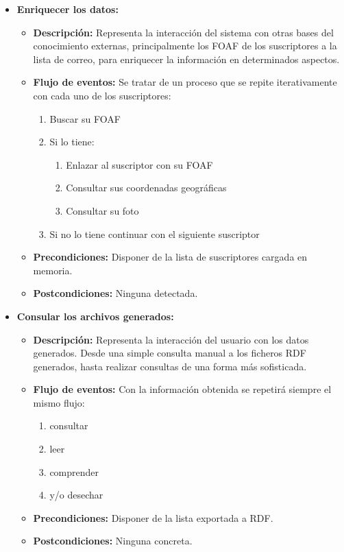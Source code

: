 \begin{itemize}
  \item \textbf{Enriquecer los datos:}
 	\begin{itemize}
 	  \item \textbf{Descripción:} Representa la interacción del 
		sistema con otras bases del conocimiento externas, 
		principalmente los FOAF de los suscriptores a la lista 
		de correo, para enriquecer la información en determinados 
		aspectos.
 	  \item \textbf{Flujo de eventos:} Se tratar de un proceso que se 
		repite iterativamente con cada uno de los suscriptores:
		\begin{enumerate}
		 \item Buscar su FOAF
		 \item Si lo tiene:
		 \begin{enumerate}
		  \item	Enlazar al suscriptor con su FOAF
		  \item Consultar sus coordenadas geográficas
		  \item Consultar su foto
		 \end{enumerate}
		 \item Si no lo tiene continuar con el siguiente suscriptor
		\end{enumerate}
	  \item \textbf{Precondiciones:} Disponer de la lista de suscriptores 
		cargada en memoria.
	  \item \textbf{Postcondiciones:} Ninguna detectada.
	\end{itemize}

  \item \textbf{Consular los archivos generados:}
 	\begin{itemize}
 	  \item \textbf{Descripción:} Representa la interacción del 
		usuario con los datos generados. Desde una simple consulta 
		manual a los ficheros RDF generados, hasta realizar consultas 
		de una forma más sofisticada.
 	  \item \textbf{Flujo de eventos:} Con la información obtenida se 
		repetirá siempre el mismo flujo:
		\begin{enumerate}
		 \item consultar
		 \item leer
		 \item comprender
		 \item y/o desechar
		\end{enumerate}
	  \item \textbf{Precondiciones:} Disponer de la lista exportada a RDF.
	  \item \textbf{Postcondiciones:} Ninguna concreta.
	\end{itemize}


\end{itemize}
